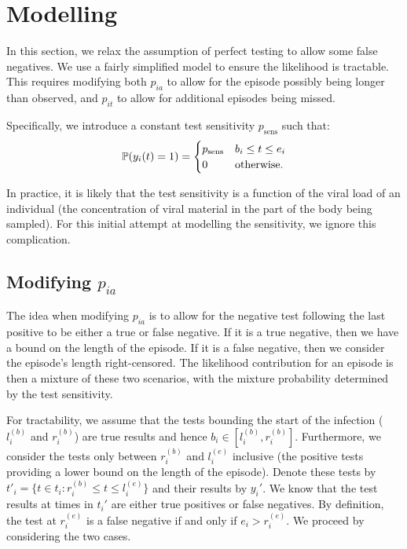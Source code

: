 \documentclass[thesis.tex]{subfiles}
\begin{document}

\section{Modelling} \label{imperf-test:sec:modelling}

In this section, we relax the assumption of perfect testing to allow
some false negatives. We use a fairly simplified model to ensure the
likelihood is tractable. This requires modifying both $p_{ia}$ to
allow for the episode possibly being longer than observed, and
$p_{it}$ to allow for additional episodes being missed.

Specifically, we introduce a constant test sensitivity $p_\text{sens}$
such that:
\begin{align}
\operatorname{\mathbb{P}}(y_i(t) = 1) = \begin{cases} p_\text{sens} &b_i \leq t \leq e_i \\ 0 &\text{otherwise.}\end{cases}
\end{align}

In practice, it is likely that the test sensitivity is a function of the
viral load of an individual (the concentration of viral material in the
part of the body being sampled). For this initial attempt at modelling
the sensitivity, we ignore this complication.

\subsection{Modifying \texorpdfstring{$p_{ia}$}{pia}} \label{modifying-p_ia}

The idea when modifying $p_{ia}$ is to allow for the negative test
following the last positive to be either a true or false negative. If it
is a true negative, then we have a bound on the length of the episode.
If it is a false negative, then we consider the episode's length
right-censored. The likelihood contribution for an episode is then a
mixture of these two scenarios, with the mixture probability determined
by the test sensitivity.

For tractability, we assume that the tests bounding the start of the
infection ($l_i^{(b)}$ and $r_i^{(b)}$) are true results and hence
$b_i \in [l_i^{(b)}, r_i^{(b)}]$. Furthermore, we consider the tests
only between $r_i^{(b)}$ and $l_i^{(e)}$ inclusive (the positive
tests providing a lower bound on the length of the episode). Denote
these tests by
$t'_i = \{ t \in t_i : r_i^{(b)} \leq t \leq l_i^{(e)} \}$ and their
results by $y_i'$. We know that the test results at times in $t_i'$
are either true positives or false negatives. By definition, the test at
$r_i^{(e)}$ is a false negative if and only if $e_i > r_i^{(e)}$. We
proceed by considering the two cases.
\end{document}
